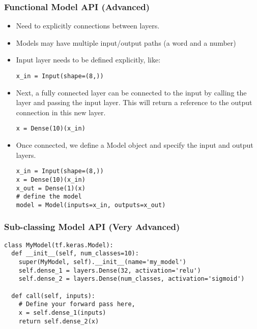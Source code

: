\begin{frame}[fragile] \frametitle{Functional Model API (Advanced)}

\begin{itemize}
\item Need to explicitly connections between layers.
\item Models may have multiple input/output paths (a word and a number)
\item Input layer needs to be defined explicitly, like:
\begin{lstlisting}
x_in = Input(shape=(8,))
\end{lstlisting}

\item Next, a fully connected layer can be connected to the input by calling the layer and passing the input layer. This will return a reference to the output connection in this new layer.
\begin{lstlisting}
x = Dense(10)(x_in)
\end{lstlisting}

\item Once connected, we define a Model object and specify the input and output layers.
\begin{lstlisting}
x_in = Input(shape=(8,))
x = Dense(10)(x_in)
x_out = Dense(1)(x)
# define the model
model = Model(inputs=x_in, outputs=x_out)
\end{lstlisting}
\end{itemize}
\end{frame}

\begin{frame}[fragile] \frametitle{Sub-classing Model API (Very Advanced)}


\begin{lstlisting}
class MyModel(tf.keras.Model):
  def __init__(self, num_classes=10):
    super(MyModel, self).__init__(name='my_model')
    self.dense_1 = layers.Dense(32, activation='relu')
    self.dense_2 = layers.Dense(num_classes, activation='sigmoid')
	
  def call(self, inputs):
    # Define your forward pass here,
    x = self.dense_1(inputs)
    return self.dense_2(x)
\end{lstlisting}
\end{frame}


